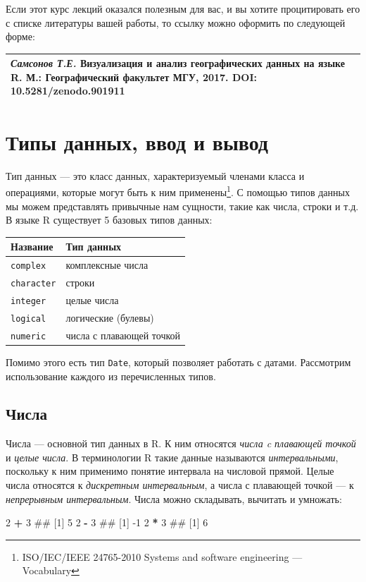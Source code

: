 \documentclass[]{book}
\newenvironment{Shaded}{\begin{snugshade}}{\end{snugshade}}
\newcommand{\DecValTok}[1]{\textcolor[rgb]{0.00,0.00,0.81}{#1}}
\newcommand{\StringTok}[1]{\textcolor[rgb]{0.31,0.60,0.02}{#1}}
\newcommand{\OperatorTok}[1]{\textcolor[rgb]{0.81,0.36,0.00}{\textbf{#1}}}
\newcommand{\NormalTok}[1]{#1}
\let\rmarkdownfootnote\footnote%
\def\footnote{\protect\rmarkdownfootnote}
\begin{document}
Если этот курс лекций оказался полезным для вас, и вы хотите
процитировать его с списке литературы вашей работы, то ссылку можно
оформить по следующей форме:

\begin{longtable}[]{@{}l@{}}
\toprule
\emph{Самсонов Т.Е.} \textbf{Визуализация и анализ географических данных
на языке R.} М.: Географический факультет МГУ, 2017. DOI:
10.5281/zenodo.901911\tabularnewline
\bottomrule
\end{longtable}

\chapter{Типы данных, ввод и вывод}\label{data_types}

Тип данных --- это класс данных, характеризуемый членами класса и
операциями, которые могут быть к ним применены\footnote{ISO/IEC/IEEE
  24765-2010 Systems and software engineering --- Vocabulary}. С помощью
типов данных мы можем представлять привычные нам сущности, такие как
числа, строки и т.д. В языке R существует 5 базовых типов данных:

\begin{longtable}[]{@{}ll@{}}
\toprule
Название & Тип данных\tabularnewline
\midrule
\endhead
\texttt{complex} & комплексные числа\tabularnewline
\texttt{character} & строки\tabularnewline
\texttt{integer} & целые числа\tabularnewline
\texttt{logical} & логические (булевы)\tabularnewline
\texttt{numeric} & числа с плавающей точкой\tabularnewline
\bottomrule
\end{longtable}

Помимо этого есть тип \texttt{Date}, который позволяет работать с
датами. Рассмотрим использование каждого из перечисленных типов.

\section{Числа}\label{numbers}

Числа --- основной тип данных в R. К ним относятся \emph{числа c
плавающей точкой} и \emph{целые числа}. В терминологии R такие данные
называются \emph{интервальными}, поскольку к ним применимо понятие
интервала на числовой прямой. Целые числа относятся к \emph{дискретным
интервальным}, а числа с плавающей точкой --- к \emph{непрерывным
интервальным}. Числа можно складывать, вычитать и умножать:

\begin{Shaded}
\begin{Highlighting}[]
\DecValTok{2} \OperatorTok{+}\StringTok{ }\DecValTok{3}
\NormalTok{## [1] 5}
\DecValTok{2} \OperatorTok{-}\StringTok{ }\DecValTok{3}
\NormalTok{## [1] -1}
\DecValTok{2} \OperatorTok{*}\StringTok{ }\DecValTok{3}
\NormalTok{## [1] 6}
\end{Highlighting}
\end{Shaded}
\end{document}

